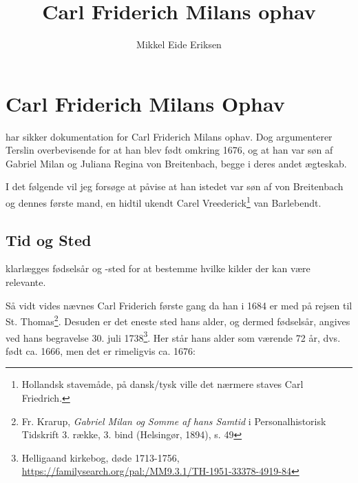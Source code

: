 \documentclass[
	a4paper,
	12pt,
	final
]{memoir}
\author{Mikkel Eide Eriksen}
\title{Carl Friderich Milans ophav}
\begin{document}
\mainmatter

\chapter{Carl Friderich Milans Ophav} %

 har sikker dokumentation for Carl Friderich Milans ophav. Dog argumenterer Terslin overbevisende for at han blev født omkring 1676, og at han var søn af Gabriel Milan og Juliana Regina von Breitenbach, begge i deres andet ægteskab.

I det følgende vil jeg forsøge at påvise at han istedet var søn af von Breitenbach og dennes første mand, en hidtil ukendt Carel Vreederick\footnote{Hollandsk stavemåde, på dansk/tysk ville det nærmere staves Carl Friedrich.} van Barlebendt.

\section{Tid og Sted}

 klarlægges fødselsår og -sted for at bestemme hvilke kilder der kan være relevante.

Så vidt vides nævnes Carl Friderich første gang da han i 1684 er med på rejsen til St. Thomas\footnote{Fr. Krarup, \emph{Gabriel Milan og Somme af hans Samtid} i Personalhistorisk Tidskrift 3. række, 3. bind (Helsingør, 1894), s. 49}. Desuden er det eneste sted hans alder, og dermed fødselsår, angives ved hans begravelse 30. juli 1738\footnote{ Helligaand kirkebog, døde 1713-1756, \url{https://familysearch.org/pal:/MM9.3.1/TH-1951-33378-4919-84}}. Her står hans alder som værende 72 år, dvs. født ca. 1666, men det er rimeligvis ca. 1676:

\end{document}
